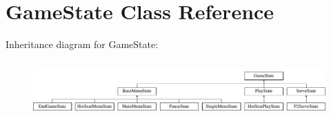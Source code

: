 \hypertarget{class_game_state}{}\section{Game\+State Class Reference}
\label{class_game_state}
Inheritance diagram for Game\+State\+:\begin{figure}[H]
\begin{center}
\leavevmode
\includegraphics[height=2.258065cm]{class_game_state}
\end{center}
\end{figure}
